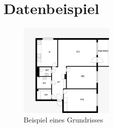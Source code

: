 \documentclass[deutsch]{scrartcl}
\begin{document}
\section{Datenbeispiel}
\begin{figure}[h!]
 \centering
 \includegraphics[width=0.4\textwidth]{model.png}
 \caption{Beispiel eines Grundrisses}
 \label{fig:img}
\end{figure}
\end{document}

